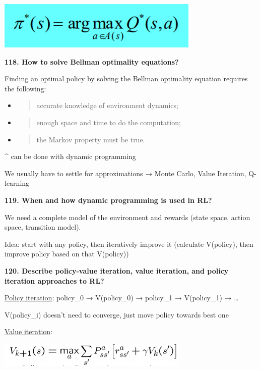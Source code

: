 \includegraphics[width=3.79843in,height=0.89604in]{media/image28.png}

\textbf{118. How to solve Bellman optimality equations?}

Finding an optimal policy by solving the Bellman optimality equation
requires the following:

\begin{itemize}
\item
  \begin{quote}
  accurate knowledge of environment dynamics;
  \end{quote}
\item
  \begin{quote}
  enough space and time to do the computation;
  \end{quote}
\item
  \begin{quote}
  the Markov property must be true.
  \end{quote}
\end{itemize}

\^{} can be done with dynamic programming

We usually have to settle for approximations → Monte Carlo, Value
Iteration, Q-learning

\textbf{119. When and how dynamic programming is used in RL?}

We need a complete model of the environment and rewards (state space,
action space, transition model).

Idea: start with any policy, then iteratively improve it (calculate
V(policy), then improve policy based on that V(policy))

\textbf{120. Describe policy-value iteration, value iteration, and
policy iteration approaches to RL?}

\underline{Policy iteration}: policy\_0 → V(policy\_0) → policy\_1 →
V(policy\_1) → \ldots{}

V(policy\_i) doesn't need to converge, just move policy towards best one

\underline{Value iteration}:

\includegraphics[width=3.60938in,height=0.46166in]{media/image34.png}

